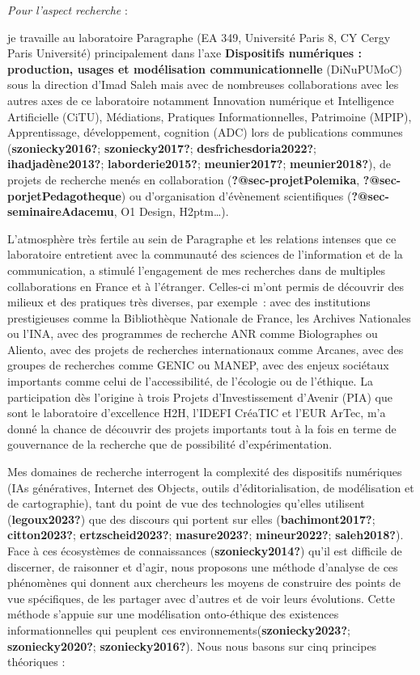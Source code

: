 \documentclass[
  a4paper,
  DIV=11,
  numbers=noendperiod]{scrreprt}
\begin{document}
\emph{Pour l'aspect recherche} :

je travaille au laboratoire Paragraphe (EA 349, Université Paris 8, CY
Cergy Paris Université) principalement dans l'axe \textbf{Dispositifs
numériques : production, usages et modélisation communicationnelle}
(DiNuPUMoC) sous la direction d'Imad Saleh mais avec de nombreuses
collaborations avec les autres axes de ce laboratoire notamment
Innovation numérique et Intelligence Artificielle (CiTU), Médiations,
Pratiques Informationnelles, Patrimoine (MPIP), Apprentissage,
développement, cognition (ADC) lors de publications communes
(\textbf{szoniecky2016?}; \textbf{szoniecky2017?};
\textbf{desfrichesdoria2022?}; \textbf{ihadjadène2013?};
\textbf{laborderie2015?}; \textbf{meunier2017?}; \textbf{meunier2018?}),
de projets de recherche menés en collaboration
(\textbf{?@sec-projetPolemika}, \textbf{?@sec-porjetPedagotheque}) ou
d'organisation d'évènement scientifiques
(\textbf{?@sec-seminaireAdacemu}, O1 Design, H2ptm\ldots).

L'atmosphère très fertile au sein de Paragraphe et les relations
intenses que ce laboratoire entretient avec la communauté des sciences
de l'information et de la communication, a stimulé l'engagement de mes
recherches dans de multiples collaborations en France et à l'étranger.
Celles-ci m'ont permis de découvrir des milieux et des pratiques très
diverses, par exemple~: avec des institutions prestigieuses comme la
Bibliothèque Nationale de France, les Archives Nationales ou l'INA, avec
des programmes de recherche ANR comme Biolographes ou Aliento, avec des
projets de recherches internationaux comme Arcanes, avec des groupes de
recherches comme GENIC ou MANEP, avec des enjeux sociétaux importants
comme celui de l'accessibilité, de l'écologie ou de l'éthique. La
participation dès l'origine à trois Projets d'Investissement d'Avenir
(PIA) que sont le laboratoire d'excellence H2H, l'IDEFI CréaTIC et l'EUR
ArTec, m'a donné la chance de découvrir des projets importants tout à la
fois en terme de gouvernance de la recherche que de possibilité
d'expérimentation.

Mes domaines de recherche interrogent la complexité des dispositifs
numériques (IAs génératives, Internet des Objects, outils
d'éditorialisation, de modélisation et de cartographie), tant du point
de vue des technologies qu'elles utilisent (\textbf{legoux2023?}) que
des discours qui portent sur elles (\textbf{bachimont2017?};
\textbf{citton2023?}; \textbf{ertzscheid2023?}; \textbf{masure2023?};
\textbf{mineur2022?}; \textbf{saleh2018?}). Face à ces écosystèmes de
connaissances (\textbf{szoniecky2014?}) qu'il est difficile de
discerner, de raisonner et d'agir, nous proposons une méthode d'analyse
de ces phénomènes qui donnent aux chercheurs les moyens de construire
des points de vue spécifiques, de les partager avec d'autres et de voir
leurs évolutions. Cette méthode s'appuie sur une modélisation
onto-éthique des existences informationnelles qui peuplent ces
environnements(\textbf{szoniecky2023?}; \textbf{szoniecky2020?};
\textbf{szoniecky2016?}). Nous nous basons sur cinq principes théoriques
:
\end{document}
